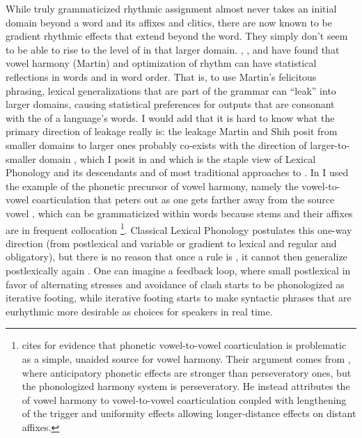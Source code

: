 \documentclass[output=paper,
modfonts
]{LSP/langsci}
\begin{document}
While truly grammaticized rhythmic  assignment almost never takes an initial domain beyond a word and its affixes and clitics, there are now known to be gradient rhythmic effects that extend beyond the word. They simply don’t seem to be able to rise to the level of  in that larger domain. \citet{martin2007}, \citet{anttila2010}, and \citet{shih2016} have found that vowel harmony (Martin) and optimization of rhythm can have statistical reflections in   words and in  word order. That is, to use Martin’s felicitous phrasing, lexical generalizations that are part of the grammar can “leak” into larger domains, causing statistical preferences for outputs that are consonant with the  of a language’s words. I would add that it is hard to know what the primary direction of leakage really is: the leakage Martin and Shih posit from smaller domains to larger ones probably co-exists with the direction of larger-to-smaller domain , which I posit in \citet{kaisseforthcoming} and which is the staple view of Lexical Phonology and its descendants \citep{kiparsky1982b,bermudez-Otero2015} and of most traditional approaches to . In \citet{kaisseforthcoming} I used the example of the phonetic precursor of vowel harmony, namely the vowel-to-vowel coarticulation that peters out as one gets farther away from the source vowel \citep{ohman1966,ohala1992,flemming1997}, which can be grammaticized within words because stems and their affixes are in frequent collocation \citep{bybee2006a}\footnote{\citet{barnes2006} cites \citet{inkelas2001k} for evidence that phonetic vowel-to-vowel coarticulation is problematic as a simple, unaided source for vowel harmony. Their argument comes from , where anticipatory phonetic effects are stronger than perseveratory ones, but the phonologized harmony system is perseveratory. He instead attributes the  of vowel harmony to vowel-to-vowel coarticulation coupled with lengthening of the trigger  and  uniformity effects allowing longer-distance effects on distant affixes.}. Classical Lexical Phonology postulates this one-way direction (from postlexical and variable or gradient to lexical and regular and obligatory), but there is no reason that once a rule is , it cannot then generalize postlexically again \citep{kaisse1993}. One can imagine a feedback loop, where small postlexical  in favor of alternating stresses and avoidance of  clash starts to be phonologized as iterative footing, while iterative footing starts to make syntactic phrases that are eurhythmic more desirable as choices for speakers in real time. 
\end{document}
